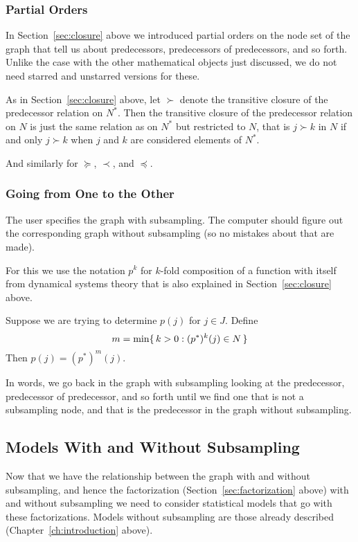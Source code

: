 \subsubsection{Partial Orders}

In Section~\ref{sec:closure} above we introduced partial orders on the
node set of the graph that tell us about predecessors, predecessors of
predecessors, and so forth.  Unlike the case with the other mathematical
objects just discussed, we do not need starred and unstarred versions
for these.

As in Section~\ref{sec:closure} above, let $\succ$ denote the transitive
closure of the predecessor relation on $N^*$.  Then the transitive
closure of the predecessor relation on $N$ is just the same relation
as on $N^*$ but restricted to $N$, that is $j \succ k$ in $N$ if and only
$j \succ k$ when $j$ and $k$ are considered elements of $N^*$.

And similarly for $\succeq$, $\prec$, and $\preceq$.

\subsubsection{Going from One to the Other}

The user specifies the graph with subsampling.  The computer should figure
out the corresponding graph without subsampling (so no mistakes about that
are made).

For this we use the notation $p^k$ for $k$-fold composition of a function
with itself from dynamical systems theory that is also explained in
Section~\ref{sec:closure} above.

Suppose we are trying to determine $p(j)$ for $j \in J$.
Define
$$
   m = \min \{\,  k > 0 : (p^*)^k(j) \in N  \,\}
$$
Then $p(j) = (p^*)^m(j)$.

In words, we go back in the graph with subsampling looking at the predecessor,
predecessor of predecessor, and so forth until we find one that is not a
subsampling node, and that is the predecessor in the graph without subsampling.

\subsection{Models With and Without Subsampling}
\label{sec:models-with-and-without}

Now that we have the relationship between the graph with and without
subsampling, and hence the factorization (Section~\ref{sec:factorization}
above) with and without subsampling we need to consider statistical models
that go with these factorizations.  Models without subsampling are those
already described (Chapter~\ref{ch:introduction} above).

